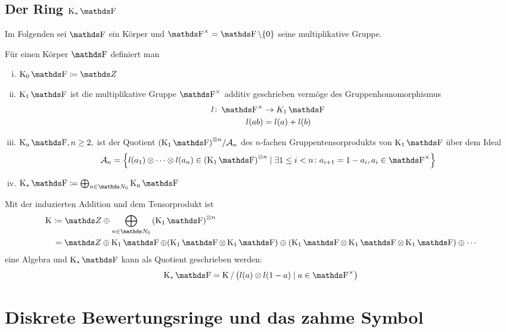 \documentclass[ngerman,fontsize=11pt, paper=a4, parskip=half, titlepage=true, toc=bib]{scrartcl}
\begin{document}
\subsection{Der Ring $\KF$}
Im Folgenden sei $\F$ ein Körper und $\Fx=\F\setminus \{0\}$ seine
multiplikative Gruppe.

\begin{Def}[$\KF$]
  Für einen Körper $\F$ definiert man
  \begin{enumerate}[i)]
  \item $\K_0\F\coloneqq \Z$
  \item $\K_1\F$ ist die multiplikative Gruppe $\Fx$ additiv geschrieben
    vermöge des Gruppenhomomorphismus 
    \begin{align*}
      l\colon \Fx&\to K_1\F\\
      l(ab)&=l(a)+l(b)
    \end{align*}
  \item $\KnF, n\geq 2,$ ist der Quotient 
    ${(\K_1\F)}^{\otimes n}/\A_n$
    des $n$-fachen Gruppentensorprodukts von $\K_1\F$ über dem Ideal 
    \begin{gather*}
      \A_n=\left\{ l(a_1)\otimes\dotsb\otimes l(a_n)
        \in {(\K_1\F)}^{\otimes n}
        \mid
        \exists 1\leq i < n \colon a_{i+1}=1-a_i, a_i\in\Fx \right\}
    \end{gather*}
  \item $\KF\coloneqq \bigoplus_{n\in\N_0}\KnF$
  \end{enumerate}
\end{Def}


\begin{Bem}
  Mit der induzierten Addition und dem Tensorprodukt ist
  \begin{align*}
    \K &\coloneqq
    \Z\oplus\bigoplus_{n\in\N_0}{(\K_1\F)}^{\otimes n}\\
    &\,= \Z\oplus\K_1\F
    \oplus(\K_1\F\otimes\K_1\F)
    \oplus(\K_1\F\otimes\K_1\F\otimes\K_1\F)
    \oplus\dotsb
  \end{align*}
  eine Algebra und
  $\KF$ kann als Quotient geschrieben werden:
  \begin{gather*}
    \KF = \K / \left(l(a)\otimes l(1-a)\mid a\in\Fx\right)
  \end{gather*}
\end{Bem}

\section{Diskrete Bewertungsringe und das zahme Symbol}
\cite[][Lemma 2.1]{milnor}
\end{document}
